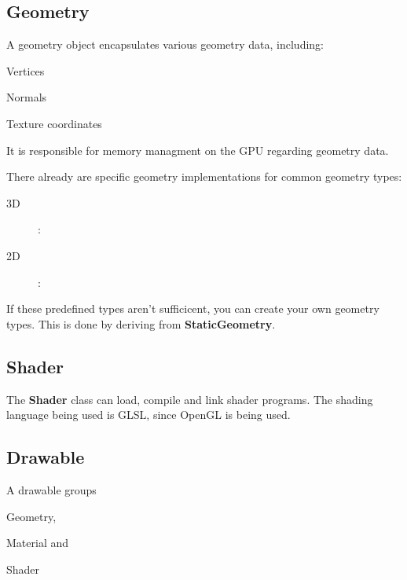 \documentclass[12p, paper=a4, leqno, colorinlistoftodos]{article}
\newenvironment{packed_itemize}
{\begin{itemize}
		\setlength{\itemsep}{0pt}
		\setlength{\parskip}{0pt}
		\setlength{\parsep}{0pt}
	}{\end{itemize}}
\begin{document}
		\subsection{Geometry}
			A geometry object encapsulates various geometry data, including:
			\begin{packed_itemize}
				\item Vertices
				\item Normals
				\item Texture coordinates
			\end{packed_itemize}
			It is responsible for memory managment on the GPU regarding geometry data.
			
			There already are specific geometry implementations for common geometry types:
			\begin{description}
				\item[3D]: 
				\item[2D]:
			\end{description}
			If these predefined types aren't sufficicent, you can create your own geometry types. This is done by deriving from \textbf{StaticGeometry}.
			
			
		\subsection{Shader}
			The \textbf{Shader} class can load, compile and link shader programs. The shading language being used is GLSL, since OpenGL is being used.
		
		\subsection{Drawable}
			A drawable groups
			\begin{packed_itemize}
				\item Geometry,
				\item Material and
				\item Shader
			\end{packed_itemize}
		
\end{document}
